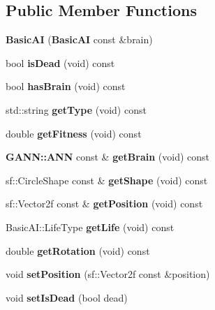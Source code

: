 \subsection*{Public Member Functions}
\begin{DoxyCompactItemize}
\item 
{\bfseries Basic\+A\+I} ({\bf Basic\+A\+I} const \&brain)\label{class_basic_a_i_a20b3d66ec4d20eefe762d25f1d432cdc}

\item 
bool {\bfseries is\+Dead} (void) const \label{class_basic_a_i_aa80777b28bd2c98732d34c50dbc23870}

\item 
bool {\bfseries has\+Brain} (void) const \label{class_basic_a_i_a3c8903e8a2ccb1f27bcd4f2a28328d68}

\item 
std\+::string {\bfseries get\+Type} (void) const \label{class_basic_a_i_aaae0c1fad0b458e8e4a40d5df1434314}

\item 
double {\bfseries get\+Fitness} (void) const \label{class_basic_a_i_aef4cbf8ed453dd856ab9bf13b3eef948}

\item 
{\bf G\+A\+N\+N\+::\+A\+N\+N} const \& {\bfseries get\+Brain} (void) const \label{class_basic_a_i_a4a625d4b6cb560577ec88e961cbb1fc6}

\item 
sf\+::\+Circle\+Shape const \& {\bfseries get\+Shape} (void) const \label{class_basic_a_i_a46c7597eed3661cd7d9867c1fe7347b4}

\item 
sf\+::\+Vector2f const \& {\bfseries get\+Position} (void) const \label{class_basic_a_i_a48c3eed805717a010a4741995b115b40}

\item 
Basic\+A\+I\+::\+Life\+Type {\bfseries get\+Life} (void) const \label{class_basic_a_i_a60fb027377f183a0fd84699d4bf6f594}

\item 
double {\bfseries get\+Rotation} (void) const \label{class_basic_a_i_ac6f0508042b9c3d5b2f5d95b75d4f168}

\item 
void {\bfseries set\+Position} (sf\+::\+Vector2f const \&position)\label{class_basic_a_i_a4a0fc5ad014416687da6e570a55e3751}

\item 
void {\bfseries set\+Is\+Dead} (bool dead)\label{class_basic_a_i_a75c76818c9e917fe6222d6537ea1a6a8}


\end{DoxyCompactItemize}

